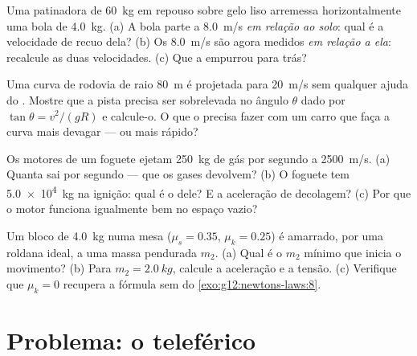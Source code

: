 \begin{exercise}[$\star\star\star$]\label{exo:g12:newtons-laws:12}
Uma patinadora de \qty{60}{kg} em repouso sobre gelo liso arremessa horizontalmente
uma bola de \qty{4.0}{kg}. (a) A bola parte a \qty{8.0}{m/s} \emph{em relação ao
solo}: qual é a velocidade de recuo dela? (b) Os \qty{8.0}{m/s} são agora medidos
\emph{em relação a ela}: recalcule as duas velocidades. (c) Que  a empurrou para
trás?
\end{exercise}

\begin{exercise}[$\star\star\star$]\label{exo:g12:newtons-laws:13}
Uma curva de rodovia de raio \qty{80}{m} é projetada para \qty{20}{m/s} sem qualquer
ajuda do . Mostre que a pista precisa ser sobrelevada no ângulo $\theta$ dado
por $\tan\theta = v^2/(gR)$ e calcule-o. O que o  precisa fazer com um carro que
faça a curva mais devagar --- ou mais rápido?
\end{exercise}

\begin{exercise}[$\star\star\star$]\label{exo:g12:newtons-laws:14}
Os motores de um foguete ejetam \qty{250}{kg} de gás por segundo a \qty{2500}{m/s}.
(a) Quanta  sai por segundo --- que  os gases
devolvem? (b) O foguete tem \qty{5.0e4}{kg} na ignição: qual é o  dele? E a
aceleração de decolagem? (c) Por que o motor funciona igualmente bem no espaço vazio?
\end{exercise}

\begin{exercise}[$\star\star\star$]\label{exo:g12:newtons-laws:15}
Um bloco de \qty{4.0}{kg} numa mesa ($\mu_s = 0.35$, $\mu_k = 0.25$) é amarrado, por
uma roldana ideal, a uma massa pendurada $m_2$. (a) Qual é o $m_2$ mínimo que inicia o
movimento? (b) Para $m_2 = \qty{2.0}{kg}$, calcule a aceleração e a tensão.
(c) Verifique que $\mu_k = 0$ recupera a fórmula sem  do
\cref{exo:g12:newtons-laws:8}.
\end{exercise}

\section{Problema: o teleférico}


